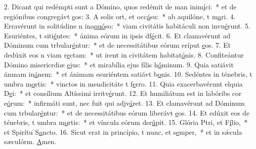 2. Dicant qui redémpti sunt a Dómino, quos redémit de man inim\uline{í}ci:~* et de regiónibus congregávt \uline{e}os:
3. A solis ort, et occ\uline{á}su:~* ab aquilóne, t m\uline{a}ri.
4. Erravérunt in solitúdine n ina\uline{quó}so:~* viam civitátis habitáculi non invn\uline{é}runt.
5. Esuriéntes, t siti\uline{é}ntes:~* ánima eórum in ipsis df\uline{é}cit.
6. Et clamavérunt ad Dóminum cum trbular\uline{é}ntur:~* et de necessitátibus eórum eríput \uline{e}os.
7. Et dedúxit eos n viam r\uline{e}ctam:~* ut irent in civitátem habitat\uline{ó}nis.
8. Confiteántur Dómino misericrdiæ \uline{e}jus:~* et mirabília ejus fílis h\uline{ó}minum.
9. Quia satiávit ánmam in\uline{á}nem:~* et ánimam esuriéntem satiávt b\uline{o}nis.
10. Sedéntes in ténebris, t umbra m\uline{o}rtis:~* vinctos in mendicitáte t f\uline{e}rro.
11. Quia exacerbavérunt elquia D\uline{e}i:~* et consílium Altíssimi irritv\uline{é}runt.
12. Et humiliátum est in labóribs cor e\uline{ó}rum:~* infirmáti sunt, nec fuit qui adjv\uline{á}ret.
13. Et clamavérunt ad Dóminum cum trbular\uline{é}ntur:~* et de necessitátibus eórum liberávt \uline{e}os.
14. Et edúxit eos de ténebris, t umbra m\uline{o}rtis:~* et víncula eórum dsr\uline{ú}pit.
15. Glória Ptri, et F\uline{í}lio,~* et Spirítu S\uline{a}ncto.
16. Sicut erat in princípio, t nunc, et s\uline{e}mper,~* et in sǽcula sæculórm. \uline{A}men.
